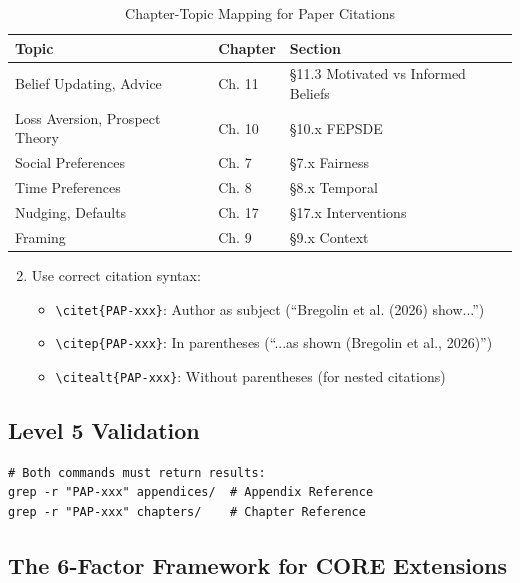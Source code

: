 \begin{table}[htbp]
\centering
\caption{Chapter-Topic Mapping for Paper Citations}
\label{tab:chapter-mapping}
\begin{tabular}{@{}lll@{}}
\toprule
\textbf{Topic} & \textbf{Chapter} & \textbf{Section} \\
\midrule
Belief Updating, Advice & Ch. 11 & \S11.3 Motivated vs Informed Beliefs \\
Loss Aversion, Prospect Theory & Ch. 10 & \S10.x FEPSDE \\
Social Preferences & Ch. 7 & \S7.x Fairness \\
Time Preferences & Ch. 8 & \S8.x Temporal \\
Nudging, Defaults & Ch. 17 & \S17.x Interventions \\
Framing & Ch. 9 & \S9.x Context \\
\bottomrule
\end{tabular}
\end{table}

\begin{enumerate}
    \setcounter{enumi}{1}
    \item Use correct citation syntax:
    \begin{itemize}
        \item \texttt{\textbackslash citet\{PAP-xxx\}}: Author as subject (``Bregolin et al. (2026) show...'')
        \item \texttt{\textbackslash citep\{PAP-xxx\}}: In parentheses (``...as shown (Bregolin et al., 2026)'')
        \item \texttt{\textbackslash citealt\{PAP-xxx\}}: Without parentheses (for nested citations)
    \end{itemize}
\end{enumerate}

\subsection{Level 5 Validation}

\begin{verbatim}
# Both commands must return results:
grep -r "PAP-xxx" appendices/  # Appendix Reference
grep -r "PAP-xxx" chapters/    # Chapter Reference
\end{verbatim}

\subsection{The 6-Factor Framework for CORE Extensions}
\label{sec:paperint-6factor}

